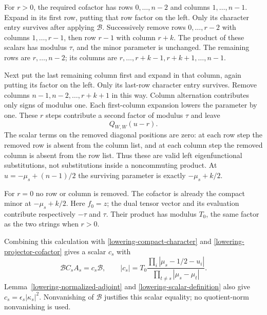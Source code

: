 For $r>0$, the required cofactor has rows $0,\ldots,n-2$ and columns
$1,\ldots,n-1$.  Expand in its first row, putting that row factor on
the left.  Only its character entry survives after applying
$\mathcal B$.  Successively remove rows $0,\ldots,r-2$ with columns
$1,\ldots,r-1$, then row $r-1$ with column $r+k$.  The product of
these scalars has modulus $\tau$, and the minor parameter is unchanged.
The remaining rows are $r,\ldots,n-2$; its columns are
$r,\ldots,r+k-1,r+k+1,\ldots,n-1$.

Next put the last remaining column first and expand in that column,
again putting its factor on the left.  Only its last-row character
entry survives.  Remove columns $n-1,n-2,\ldots,r+k+1$ in this way.
Column alternation contributes only signs of modulus one.  Each
first-column expansion lowers the parameter by one.  These $r$
steps contribute a second factor of modulus $\tau$ and leave
\[
                    Q_{W,W}(u-r).
\]
The scalar terms on the removed diagonal positions are zero: at each
row step the removed row is absent from the column list, and at each
column step the removed column is absent from the row list.  Thus
these are valid left eigenfunctional substitutions, not substitutions
inside a noncommuting product.  At $u=-\mu_s+(n-1)/2$ the surviving
parameter is exactly $-\mu_s+k/2$.

For $r=0$ no row or column is removed.  The cofactor is already the
compact minor at $-\mu_s+k/2$.  Here $f_0=z$; the dual tensor vector
and its evaluation contribute respectively $-\tau$ and $\tau$.
Their product has modulus $T_0$, the same factor as the two strings
when $r>0$.

Combining this calculation with
\eqref{lowering-compact-character} and
\eqref{lowering-projector-cofactor} gives a scalar $c_s$ with
\begin{equation}\label{lowering-evaluation-scalar}
 \mathcal B C_sA_s=c_s\mathcal B,
 \qquad
 |c_s|=T_0\frac{\prod_i|\mu_s-1/2-u_i|}
                     {\prod_{t\ne s}|\mu_s-\mu_t|}.
\end{equation}
Lemma~\ref{lowering-normalized-adjoint} and
\eqref{lowering-scalar-definition} also give
$c_s=\epsilon_s|\kappa_s|^2$.  Nonvanishing of $\mathcal B$ justifies
this scalar equality; no quotient-norm nonvanishing is used.

